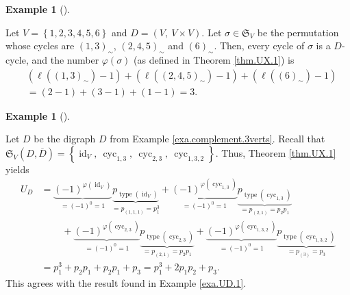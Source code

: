 \documentclass[numbers=enddot,12pt,final,onecolumn,notitlepage]{scrartcl}%
\numberwithin{exer}{section}
\theoremstyle{definition}
\newtheorem{exam}[theo]{Example}
\newenvironment{example}[1][]
{\begin{exam}[#1]\begin{leftbar}}
{\end{leftbar}\end{exam}}
\begin{document}
\begin{example}
Let $V=\left\{  1,2,3,4,5,6\right\}  $ and $D=\left(  V,\ V\times V\right)  $.
Let $\sigma\in\mathfrak{S}_{V}$ be the permutation whose cycles are $\left(
1,3\right)  _{\sim}$, $\left(  2,4,5\right)  _{\sim}$ and $\left(  6\right)
_{\sim}$. Then, every cycle of $\sigma$ is a $D$-cycle, and the number
$\varphi\left(  \sigma\right)  $ (as defined in Theorem \ref{thm.UX.1}) is
\begin{align*}
&  \left(  \ell\left(  \left(  1,3\right)  _{\sim}\right)  -1\right)  +\left(
\ell\left(  \left(  2,4,5\right)  _{\sim}\right)  -1\right)  +\left(
\ell\left(  \left(  6\right)  _{\sim}\right)  -1\right) \\
&  =\left(  2-1\right)  +\left(  3-1\right)  +\left(  1-1\right)  =3.
\end{align*}

\end{example}

\begin{example}
Let $D$ be the digraph $D$ from Example \ref{exa.complement.3verts}. Recall
that $\mathfrak{S}_{V}\left(  D,\overline{D}\right)  =\left\{
\operatorname*{id}\nolimits_{V},\ \operatorname*{cyc}\nolimits_{1,3}%
,\ \operatorname*{cyc}\nolimits_{2,3},\ \operatorname*{cyc}\nolimits_{1,3,2}%
\right\}  $. Thus, Theorem \ref{thm.UX.1} yields%
\begin{align*}
U_{D}  &  =\underbrace{\left(  -1\right)  ^{\varphi\left(  \operatorname*{id}%
\nolimits_{V}\right)  }}_{=\left(  -1\right)  ^{0}=1}%
\underbrace{p_{\operatorname*{type}\left(  \operatorname*{id}\nolimits_{V}%
\right)  }}_{=p_{\left(  1,1,1\right)  }=p_{1}^{3}}+\underbrace{\left(
-1\right)  ^{\varphi\left(  \operatorname*{cyc}\nolimits_{1,3}\right)  }%
}_{=\left(  -1\right)  ^{0}=1}\underbrace{p_{\operatorname*{type}\left(
\operatorname*{cyc}\nolimits_{1,3}\right)  }}_{=p_{\left(  2,1\right)  }%
=p_{2}p_{1}}\\
&  \ \ \ \ \ \ \ \ \ \ +\underbrace{\left(  -1\right)  ^{\varphi\left(
\operatorname*{cyc}\nolimits_{2,3}\right)  }}_{=\left(  -1\right)  ^{0}%
=1}\underbrace{p_{\operatorname*{type}\left(  \operatorname*{cyc}%
\nolimits_{2,3}\right)  }}_{=p_{\left(  2,1\right)  }=p_{2}p_{1}%
}+\underbrace{\left(  -1\right)  ^{\varphi\left(  \operatorname*{cyc}%
\nolimits_{1,3,2}\right)  }}_{=\left(  -1\right)  ^{0}=1}%
\underbrace{p_{\operatorname*{type}\left(  \operatorname*{cyc}%
\nolimits_{1,3,2}\right)  }}_{=p_{\left(  3\right)  }=p_{3}}\\
&  =p_{1}^{3}+p_{2}p_{1}+p_{2}p_{1}+p_{3}=p_{1}^{3}+2p_{1}p_{2}+p_{3}.
\end{align*}
This agrees with the result found in Example \ref{exa.UD.1}.
\end{example}
\end{document}
